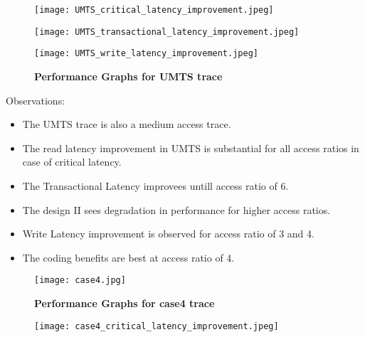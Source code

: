 \begin{landscape}
\begin{figure}[htb]
\begin{minipage}[!t]{0.33\linewidth}
        \texttt{[image: UMTS\_critical\_latency\_improvement.jpeg]}
\end{minipage}
\begin{minipage}[!t]{0.33\linewidth}
        \texttt{[image: UMTS\_transactional\_latency\_improvement.jpeg]}
\end{minipage}
\begin{minipage}[!t]{0.33\linewidth}
        \texttt{[image: UMTS\_write\_latency\_improvement.jpeg]}
\end{minipage}
\caption{
{\bf Performance Graphs for UMTS trace} }
\label{fig:UMTS_improvement}
\end{figure}
Observations:
\begin{itemize}
	\item The UMTS trace is also a medium access trace. 
	\item The read latency improvement in UMTS is substantial for all access ratios in case of critical latency. 
	\item The Transactional Latency improvees untill access ratio of 6.
	\item The design II sees degradation in performance for higher access ratios. 
	\item Write Latency improvement is observed for access ratio of 3 and 4.
	\item The coding benefits are best at access ratio of 4.
\end{itemize}
\cleardoublepage
\begin{figure}[htb]
\begin{minipage}[!t]{\linewidth}
        \texttt{[image: case4.jpg]}
\end{minipage}
\caption{
{\bf Performance Graphs for case4 trace} }
\label{fig:case4}
\end{figure}
\cleardoublepage
\begin{figure}[htb]
\begin{minipage}[!t]{0.33\linewidth}
        \texttt{[image: case4\_critical\_latency\_improvement.jpeg]}
\end{minipage}
\begin{minipage}[!t]{0.33\linewidth}

\end{minipage}
\end{figure}
\end{landscape}
